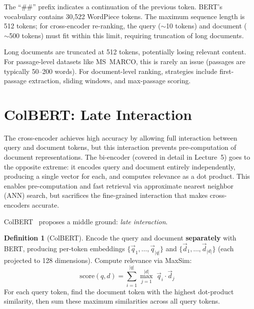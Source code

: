\documentclass[11pt,a4paper]{article}
\theoremstyle{definition}
\newtheorem{definition}{Definition}[section]
\theoremstyle{plain}
\begin{document}
The ``\#\#'' prefix indicates a continuation of the previous token. BERT's vocabulary contains 30{,}522 WordPiece tokens. The maximum sequence length is 512 tokens; for cross-encoder re-ranking, the query ($\sim$10 tokens) and document ($\sim$500 tokens) must fit within this limit, requiring truncation of long documents.

\begin{pitfall}
Long documents are truncated at 512 tokens, potentially losing relevant content. For passage-level datasets like MS~MARCO, this is rarely an issue (passages are typically 50--200 words). For document-level ranking, strategies include first-passage extraction, sliding windows, and max-passage scoring.
\end{pitfall}


\section{ColBERT: Late Interaction}
\label{sec:colbert}

The cross-encoder achieves high accuracy by allowing full interaction between query and document tokens, but this interaction prevents pre-computation of document representations. The bi-encoder (covered in detail in Lecture~5) goes to the opposite extreme: it encodes query and document entirely independently, producing a single vector for each, and computes relevance as a dot product. This enables pre-computation and fast retrieval via approximate nearest neighbor (ANN) search, but sacrifices the fine-grained interaction that makes cross-encoders accurate.

ColBERT~\cite{khattab2020colbert} proposes a middle ground: \emph{late interaction}.

\begin{definition}[ColBERT]
Encode the query and document \textbf{separately} with BERT, producing per-token embeddings $\{\vec{q}_1, \ldots, \vec{q}_{|q|}\}$ and $\{\vec{d}_1, \ldots, \vec{d}_{|d|}\}$ (each projected to 128 dimensions). Compute relevance via MaxSim:
\begin{equation}
\text{score}(q, d) = \sum_{i=1}^{|q|} \max_{j=1}^{|d|} \; \vec{q}_i \cdot \vec{d}_j
\label{eq:maxsim}
\end{equation}
For each query token, find the document token with the highest dot-product similarity, then sum these maximum similarities across all query tokens.
\end{definition}
\end{document}
